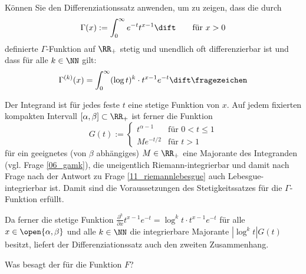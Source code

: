 \begin{frage}\label{11_gammafunktion}
  Können Sie den Differenziationssatz anwenden, um zu zeigen, dass 
  die durch 
  \[
  \Gamma(x) := \int_0^\infty e^{-t}t^{x-1} \dift\qquad\text{für $x>0$}
  \]
  definierte $\Gamma$-Funktion auf $\RR_+$ stetig und unendlich 
  oft differenzierbar ist und dass für alle $k\in\NN$ gilt: 
  \[
  \Gamma^{(k)}(x)= \int_0^\infty (\log t)^k \cdot t^{x-1} e^{-t} \dift
  \fragezeichen 
  \]
\end{frage}

\begin{antwort}
  Der Integrand ist für jedes feste $t$ eine stetige Funktion von $x$. 
  Auf jedem fixierten kompakten 
  Intervall $[\alpha,\beta]\subset \RR_+$ ist ferner die Funktion 
  \[
  G(t) := \left\{ \begin{array}{ll} 
      t^{\alpha-1} & \text{für $0<t\le 1$}\\
      Me^{-t/2}    & \text{für $t>1$}
    \end{array} \right.
  \]
  für ein geeignetes (von $\beta$ abhängiges) $M\in\RR_+$ 
  eine Majorante des Integranden (vgl. Frage \ref{06_gamk}), 
  die uneigentlich Riemann-integrierbar und damit 
  nach Frage nach der Antwort zu Frage \ref{11_riemannlebesgue} 
  auch Lebesgue-integrierbar ist. Damit sind die Voraussetzungen 
  des Stetigkeitssatzes für die $\Gamma$-Funktion erfüllt. 

  Da ferner die stetige Funktion 
  $\frac{\partial^k}{\partial x}t^{x-1}e^{-t}=\log^k t \cdot t^{x-1}e^{-t}$ 
  für alle $x\in\open{\alpha,\beta}$ und alle $k\in \NN$ 
  die integrierbare Majorante $|\log^k t| G(t)$ besitzt, liefert der 
  Differenziationssatz auch den zweiten Zusammenhang. \AntEnd
\end{antwort}

\begin{frage}
  Was besagt der  für die Funktion $F$?
\end{frage}

